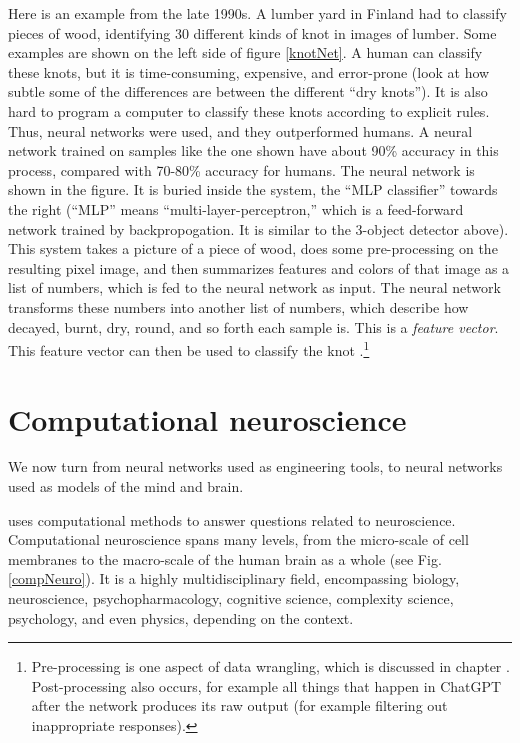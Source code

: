 Here is an example from the late 1990s. A lumber yard in Finland had to classify pieces of wood, identifying 30 different kinds of knot in images of lumber. Some examples are shown on the left side of figure \ref{knotNet}. A human can classify these knots, but it is time-consuming, expensive, and error-prone (look at how subtle some of the differences are between the different ``dry knots''). It is also hard to program a computer to classify these knots according to explicit rules. Thus, neural networks were used, and they outperformed humans. A neural network trained on samples like the one shown have about 90\% accuracy in this process, compared with 70-80\% accuracy for humans. The neural network is shown in the figure. It is  buried inside the system, the ``MLP classifier'' towards the right (``MLP'' means ``multi-layer-perceptron,'' which is a feed-forward network trained by backpropogation. It is  similar to the 3-object detector above). This system takes a picture of a piece of wood, does some pre-processing on the resulting pixel image, and then summarizes features and colors of that image as a list of numbers, which is fed to the neural network as input. The neural network transforms these numbers into another list of numbers, which describe how decayed, burnt, dry, round, and so forth each sample is. This is a \emph{feature vector}. This feature vector can then be used to classify the knot \cite{heikkonen1999building}.\footnote{Pre-processing is one aspect of data wrangling, which is discussed in chapter .  Post-processing also occurs, for example all things that happen in ChatGPT  after the network produces its raw output (for example filtering out inappropriate responses).}

\section{Computational neuroscience}\label{computationalNeuroscience}

We now turn from neural networks used as engineering tools, to neural networks used as models of the mind and brain.

 uses computational methods to answer questions related to neuroscience. Computational neuroscience spans many levels, from the micro-scale of cell membranes to the macro-scale of the human brain as a whole (see Fig. \ref{compNeuro}). It is a highly multidisciplinary field, encompassing biology, neuroscience, psychopharmacology, cognitive science, complexity science, psychology, and even physics, depending on the context. 

